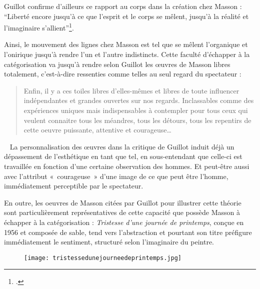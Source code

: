 	
	 Guillot confirme d’ailleurs ce rapport au corps dans la création chez Masson : \enquote{Liberté encore jusqu’à ce que l’esprit et le corps se mêlent, jusqu’à la réalité et l’imaginaire s’allient}\footcite{massonlyon}. 

	Ainsi, le mouvement des lignes chez Masson est tel que se mêlent l’organique et l’onirique jusqu’à rendre l’un et l’autre indistincts. Cette faculté d’échapper à la catégorisation va jusqu’à rendre selon Guillot les \oe{}uvres de Masson libres totalement, c’est-à-dire ressenties comme telles au seul regard du spectateur : 

	\begin{quote}
	Enfin, il y a ces toiles libres d’elles-mêmes et libres de toute influencer indépendantes et grandes ouvertes sur nos regards. Inclassables comme des expériences  uniques mais indispensables à contempler pour tous ceux qui veulent connaitre tous les méandres, tous les détours, tous les repentirs de cette oeuvre puissante, attentive et courageuse… 	
	\end{quote}
 
	 La personnalisation des \oe{}uvres dans la critique de Guillot induit déjà un dépassement de l’esthétique en tant que tel, en sous-entendant que celle-ci est travaillée en fonction d’une certaine observation des hommes. Et peut-être aussi avec l’attribut « courageuse » d’une image de ce que peut être l’homme, immédiatement perceptible par le spectateur.  

En outre, les oeuvres de Masson citées par Guillot pour illustrer cette théorie sont particulièrement représentatives de cette capacité que possède Masson à échapper à la catégorisation : \emph{Tristesse d’une journée de printemps}, conçue en 1956 et composée de sable, tend vers l’abstraction et pourtant son titre préfigure immédiatement le sentiment, structuré selon l’imaginaire du peintre. 


\begin{figure}[H]
   \centering
   \texttt{[image: tristessedunejourneedeprintemps.jpg]}
	\caption{\cite{tristesse}}\label{fig:Tristessedunejourneedeprintemps}
\end{figure}

